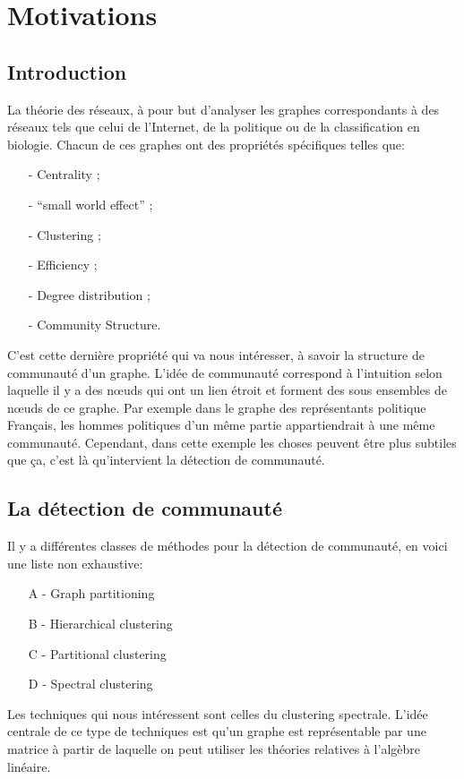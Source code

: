\section{Motivations}
\subsection{Introduction}
La théorie des réseaux, à pour but d'analyser les graphes correspondants à des réseaux tels que celui de l'Internet, de la politique ou de la classification en biologie.
Chacun de ces graphes ont des propriétés spécifiques telles que:
\begin{itemize}
 	\item[-] Centrality ;
 	\item[-] ``small world effect'' ;
 	\item[-] Clustering ;
 	\item[-] Efficiency ;
 	\item[-] Degree distribution ; 
 	\item[-] Community Structure.\\
 \end{itemize}
 C'est cette dernière propriété qui va nous intéresser, à savoir la structure de communauté d'un graphe.
 L'idée de communauté correspond à l'intuition selon laquelle il y a des nœuds qui ont un lien étroit et forment des sous ensembles de nœuds de ce graphe.
 Par exemple dans le graphe des représentants politique Français, les hommes politiques d'un même partie appartiendrait à une même communauté.
 Cependant, dans cette exemple les choses peuvent être plus subtiles que ça, c'est là qu'intervient la détection de communauté.

\subsection{La détection de communauté}
Il y a différentes classes de méthodes pour la détection de communauté, en voici une liste non exhaustive:
\begin{itemize}
	\item[A -] Graph partitioning
	\item[B -] Hierarchical clustering
	\item[C -] Partitional clustering
	\item[D -] Spectral clustering \\
\end{itemize}

Les techniques qui nous intéressent sont celles du clustering spectrale.
L'idée centrale de ce type de techniques est qu'un graphe est représentable par une matrice à partir de laquelle on peut utiliser les théories relatives à l'algèbre linéaire.

